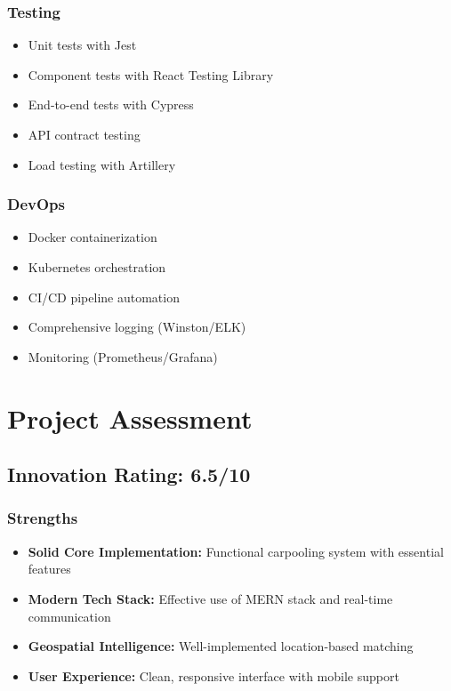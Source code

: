 \documentclass[12pt,a4paper]{article}
\begin{document}
\subsubsection{Testing}
\begin{itemize}
    \item Unit tests with Jest
    \item Component tests with React Testing Library
    \item End-to-end tests with Cypress
    \item API contract testing
    \item Load testing with Artillery
\end{itemize}

\subsubsection{DevOps}
\begin{itemize}
    \item Docker containerization
    \item Kubernetes orchestration
    \item CI/CD pipeline automation
    \item Comprehensive logging (Winston/ELK)
    \item Monitoring (Prometheus/Grafana)
\end{itemize}

\newpage

\section{Project Assessment}

\subsection{Innovation Rating: 6.5/10}

\subsubsection{Strengths}
\begin{itemize}
    \item \textbf{Solid Core Implementation:} Functional carpooling system with essential features
    \item \textbf{Modern Tech Stack:} Effective use of MERN stack and real-time communication
    \item \textbf{Geospatial Intelligence:} Well-implemented location-based matching
    \item \textbf{User Experience:} Clean, responsive interface with mobile support
\end{itemize}
\end{document}
